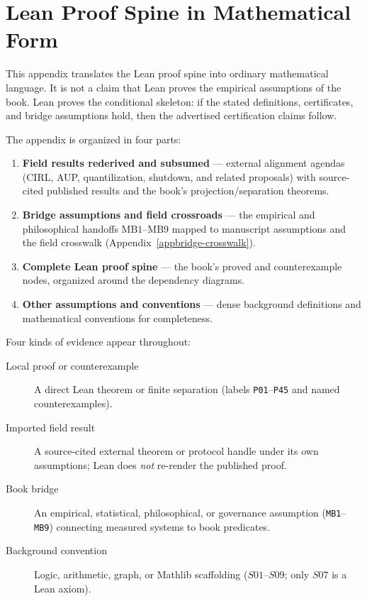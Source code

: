 \chapter{Lean Proof Spine in Mathematical Form}
\label{appi-lean-proof-spine}

This appendix translates the Lean proof spine into ordinary mathematical language.
It is not a claim that Lean proves the empirical assumptions of the book.
Lean proves the conditional skeleton: if the stated definitions, certificates, and bridge assumptions hold, then the advertised certification claims follow.

The appendix is organized in four parts:
\begin{enumerate}
\item \textbf{Field results rederived and subsumed} --- external alignment agendas (CIRL, AUP, quantilization, shutdown, and related proposals) with source-cited published results and the book's projection/separation theorems.
\item \textbf{Bridge assumptions and field crossroads} --- the empirical and philosophical handoffs \(\text{MB1}\)--\(\text{MB9}\) mapped to manuscript assumptions and the field crosswalk (Appendix~\ref{appbridge-crosswalk}).
\item \textbf{Complete Lean proof spine} --- the book's proved and counterexample nodes, organized around the dependency diagrams.
\item \textbf{Other assumptions and conventions} --- dense background definitions and mathematical conventions for completeness.
\end{enumerate}

Four kinds of evidence appear throughout:
\begin{description}
\item[Local proof or counterexample] A direct Lean theorem or finite separation (labels \texttt{P01}--\texttt{P45} and named counterexamples).
\item[Imported field result] A source-cited external theorem or protocol handle under its own assumptions; Lean does \emph{not} re-render the published proof.
\item[Book bridge] An empirical, statistical, philosophical, or governance assumption (\texttt{MB1}--\texttt{MB9}) connecting measured systems to book predicates.
\item[Background convention] Logic, arithmetic, graph, or Mathlib scaffolding (\(S01\)--\(S09\); only \(S07\) is a Lean axiom).
\end{description}

